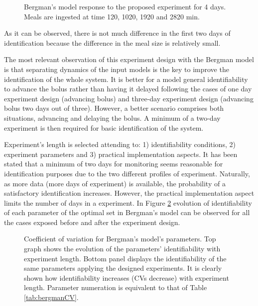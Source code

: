 \begin{itemize}
{\begin{figure}[hbt]
\centering
{}\caption{Bergman's model response to the proposed experiment for 4 days. Meals are ingested at time 120, 1020, 1920 and 2820 min.}
\label{fig:bergmanexperiment4day}
\end{figure}

As it can be observed, there is not much difference in the first two days of identification because the difference in the meal size is relatively small.}
\end{itemize}

The most relevant observation of this experiment design with the Bergman model is that separating dynamics of the input models is the key to improve the identification of the whole system. It is better for a model general identifiability to advance the bolus rather than having it delayed following the cases of one day experiment design (advancing bolus) and three-day experiment design (advancing bolus two days out of three). However, a better scenario comprises both situations, advancing and delaying the bolus. A minimum of a two-day experiment is then required for basic identification of the system. 

Experiment's length is selected attending to: 1) identifiability conditions, 2) experiment parameters and 3) practical implementation aspects. It has been stated that a minimum of two days for monitoring seems reasonable for identification purposes due to the two different profiles of experiment. Naturally, as more data (more days of experiment) is available, the probability of a satisfactory identification increases. However, the practical implementation aspect limits the number of days in a experiment. In Figure \ref{fig:Bergmandays} evolution of identifiability of each parameter of the optimal set in Bergman's model can be observed for all the cases exposed before and after the experiment design.

\begin{figure}[hbtp]
\centering
{}\caption{Coefficient of variation for Bergman's model's parameters. Top graph shows the evolution of the parameters' identifiability with experiment length. Bottom panel displays the identifiability of the same parameters applying the designed experiments. It is clearly shown how identifiability increases (CVs decrease) with experiment length. Parameter numeration is equivalent to that of Table \ref{tab:bergmanCV}.}
\label{fig:Bergmandays}
\end{figure}

